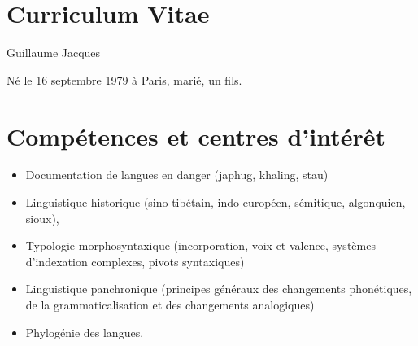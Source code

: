 \documentclass[oldfontcommands,oneside,a4paper,11pt]{article}
\begin{document}
 \sloppy
\section*{{\LARGE Curriculum Vitae}}
Guillaume Jacques

% 
Né le 16 septembre 1979 à Paris, marié, un fils.
\sloppy
\section*{Compétences et centres d’intérêt}
\begin{itemize}
\item Documentation de langues en danger (japhug, khaling, stau)
\item Linguistique historique (sino-tibétain, indo-européen, sémitique, algonquien, sioux), 
\item Typologie morphosyntaxique (incorporation, voix et valence, systèmes d'indexation complexes, pivots syntaxiques)
\item Linguistique panchronique (principes généraux des changements phonétiques, de la grammaticalisation et des changements analogiques)
\item Phylogénie des langues.
\end{itemize}
%  
\end{document}
